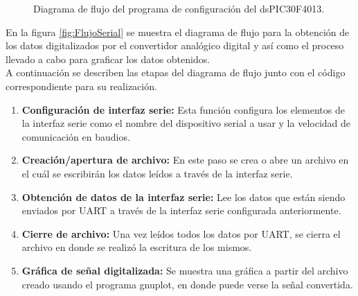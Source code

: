 	\begin{figure}[htbp!]
		\centering
		\caption{Diagrama de flujo del programa de configuración del dsPIC30F4013.}
		\label{fig:ConfiguracionMicro}
	\end{figure}

En la figura \ref{fig:FlujoSerial} se muestra el diagrama de flujo para la obtención de los datos digitalizados por el convertidor analógico digital y así como el proceso llevado a cabo para graficar los datos obtenidos.\\

A continuación se describen las etapas del diagrama de flujo junto con el código correspondiente para su realización.

\begin{enumerate}
	\item \textbf{Configuración de interfaz serie:} Esta función configura los elementos de la interfaz serie como el nombre del dispositivo serial a usar y la velocidad de comunicación en baudios.
	\item \textbf{Creación/apertura de archivo:} En este paso se crea o abre un archivo en el cuál se escribirán los datos leídos a través de la interfaz serie.
	\item \textbf{Obtención de datos de la interfaz serie:} Lee los datos que están siendo enviados por UART a través de la interfaz serie configurada anteriormente.
	\item \textbf{Cierre de archivo:} Una vez leídos todos los datos por UART, se cierra el archivo en donde se realizó la escritura de los mismos.
	\item \textbf{Gráfica de señal digitalizada:} Se muestra una gráfica a partir del archivo creado usando el programa gnuplot, en donde puede verse la señal convertida.
\end{enumerate}

